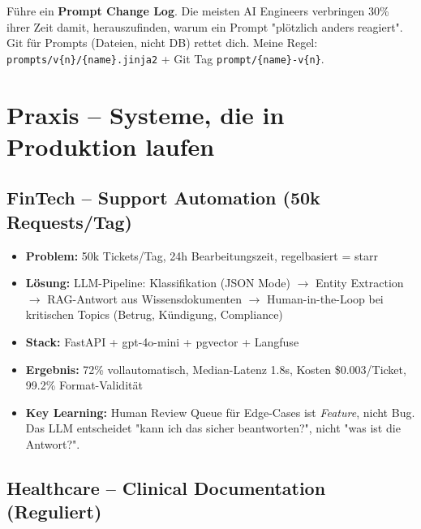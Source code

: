\par\mbox{}\par
\begin{AUTORnotizEnv}
Führe ein \textbf{Prompt Change Log}. Die meisten AI Engineers verbringen 30\% ihrer Zeit damit, herauszufinden, warum ein Prompt "plötzlich anders reagiert". Git für Prompts (Dateien, nicht DB) rettet dich. Meine Regel: \texttt{prompts/v\{n\}/\{name\}.jinja2} + Git Tag \texttt{prompt/\{name\}-v\{n\}}.
\end{AUTORnotizEnv}

\section{Praxis -- Systeme, die in Produktion laufen}

\subsection{FinTech -- Support Automation (50k Requests/Tag)}

\begin{itemize}[leftmargin=*]
    \item \textbf{Problem:} 50k Tickets/Tag, 24h Bearbeitungszeit, regelbasiert = starr
    \item \textbf{Lösung:} LLM-Pipeline: Klassifikation (JSON Mode) $\to$ Entity Extraction $\to$ RAG-Antwort aus Wissensdokumenten $\to$ Human-in-the-Loop bei kritischen Topics (Betrug, Kündigung, Compliance)
    \item \textbf{Stack:} FastAPI + gpt-4o-mini + pgvector + Langfuse
    \item \textbf{Ergebnis:} 72\% vollautomatisch, Median-Latenz 1.8s, Kosten \$0.003/Ticket, 99.2\% Format-Validität
    \item \textbf{Key Learning:} Human Review Queue für Edge-Cases ist \textit{Feature}, nicht Bug. Das LLM entscheidet "kann ich das sicher beantworten?", nicht "was ist die Antwort?".
\end{itemize}

\subsection{Healthcare -- Clinical Documentation (Reguliert)}

